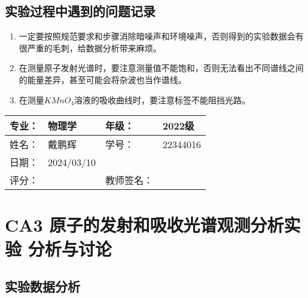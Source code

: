 \documentclass[dvipsnames, svgnames,a4paper,11pt]{article}
\begin{document}
	
	








\subsection{实验过程中遇到的问题记录}

\begin{enumerate}
	\item 一定要按照规范要求和步骤消除暗噪声和环境噪声，否则得到的实验数据会有很严重的毛刺，给数据分析带来麻烦。
	
	\item 在测量原子发射光谱时，要注意测量值不能饱和，否则无法看出不同谱线之间的能量差异，甚至可能会将杂波也当作谱线。
	
	\item 在测量$KMnO_4$溶液的吸收曲线时，要注意标签不能阻挡光路。
	

	
\end{enumerate}
	

\clearpage
\begin{table}
	\renewcommand\arraystretch{1.7}
	\begin{tabularx}{\textwidth}{|X|X|X|X|}
	\hline
	专业：& 物理学 &年级：& 2022级\\
	\hline
	姓名： & 戴鹏辉 & 学号：& 22344016\\
	\hline
    日期：& 2024/03/10 &  &\\
	\hline
	评分： &      & 教师签名：&   \\
	\hline
	\end{tabularx}
\end{table}

\section{CA3 \quad 原子的发射和吸收光谱观测分析实验 \quad\heiti 分析与讨论}

\subsection{实验数据分析}
\end{document}
